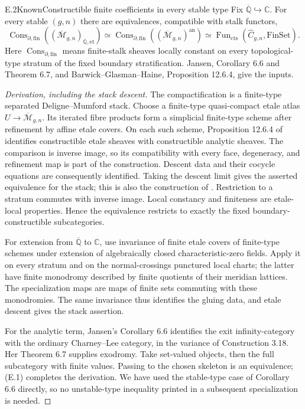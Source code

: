 \begin{result}{E.2}{Known}{Constructible finite coefficients in every stable type}
Fix $\overline{\mathbb Q}\hookrightarrow\mathbb C$.  For every stable
$(g,n)$ there are equivalences, compatible with stalk functors,
\[
 \operatorname{Cons}_{\partial,\mathrm{fin}}
       ((\overline{\mathcal M}_{g,n})_{\overline{\mathbb Q},\mathrm{et}})
 \simeq
 \operatorname{Cons}_{\partial,\mathrm{fin}}
       ((\overline{\mathcal M}_{g,n})^{\mathrm{an}})
 \simeq
 \operatorname{Fun}_{\mathrm{cts}}(\widehat C_{g,n},\mathrm{FinSet}).
                                                               \tag{E.2}
\]
Here $\operatorname{Cons}_{\partial,\mathrm{fin}}$ means finite-stalk
sheaves locally constant on every topological-type stratum of the fixed
boundary stratification.  Jansen, Corollary 6.6 and Theorem 6.7, and
Barwick--Glasman--Haine, Proposition 12.6.4, give the inputs.
\end{result}
\begin{proof}[Derivation, including the stack descent]
The compactification is a finite-type separated Deligne--Mumford stack.
Choose a finite-type quasi-compact etale atlas $U\to\overline{\mathcal
M}_{g,n}$.  Its iterated fibre products form a simplicial finite-type
scheme after refinement by affine etale covers.  On each such scheme,
Proposition 12.6.4 of \cite{ET_BGH2020} identifies constructible etale
sheaves with constructible analytic sheaves.  The comparison is inverse
image, so its compatibility with every face, degeneracy, and refinement
map is part of the construction.  Descent data and their cocycle
equations are consequently identified.  Taking the descent limit gives
the asserted equivalence for the stack; this is also the construction
of \cite[Proposition 13.9.17; Corollary 13.9.19]{ET_BGH2020}.
Restriction to a stratum commutes with inverse image.  Local constancy
and finiteness are etale-local properties.  Hence the equivalence
restricts to exactly the fixed boundary-constructible subcategories.

For extension from $\overline{\mathbb Q}$ to $\mathbb C$, use invariance
of finite etale covers of finite-type schemes under extension of
algebraically closed characteristic-zero fields.  Apply it on every
stratum and on the normal-crossings punctured local charts; the latter
have finite monodromy described by finite quotients of their meridian
lattices.  The specialization maps are maps of finite sets commuting
with these monodromies.  The same invariance thus identifies the
gluing data, and etale descent gives the stack assertion.

For the analytic term, Jansen's Corollary 6.6 identifies the exit
infinity-category with the ordinary Charney--Lee category, in the
variance of Construction 3.18.  Her Theorem 6.7 supplies exodromy.
Take set-valued objects, then the full subcategory with finite values.
Passing to the chosen skeleton is an equivalence; (E.1) completes the
derivation.  We have used the stable-type case of Corollary 6.6 directly,
so no unstable-type inequality printed in a subsequent specialization
is needed.
\end{proof}

